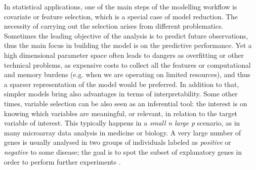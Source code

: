 \documentclass[american,]{article}
\theoremstyle{definition}
\begin{document}
In statistical applications, one of the main steps of the modelling workflow is covariate or feature selection, which is a special case of model reduction. The necessity of carrying out the selection arises from different problematics. Sometimes the leading objective of the analysis is to predict future observations, thus the main focus in building the model is on the predictive performance. Yet a high dimensional parameter space often leads to dangers as overfitting or other technical problems, as expensive costs to collect all the features or computational and memory burdens (e.g. when we are operating on limited resources), and thus a sparser representation of the model would be preferred. In addition to that, simpler models bring also advantages in terms of interpretability. Some other times, variable selection can be also seen as an inferential tool: the interest is on knowing which variables are meaningful, or relevant, in relation to the target variable of interest. This typically happens in a \textit{small n large p} scenario, as in many microarray data analysis in medicine or biology. A very large number of genes is usually analysed in two groups of individuals labeled as \textit{positive} or \textit{negative} to some disease; the goal is to spot the subset of explanatory genes in order to perform further experiments \cite[see examples in][]{efron2012large}.
\end{document}
